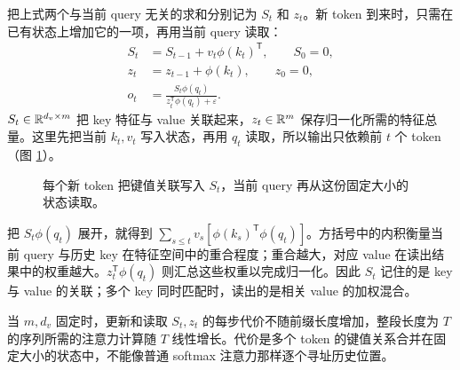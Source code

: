 把上式两个与当前 query 无关的求和分别记为 \(S_t\) 和 \(z_t\)。新 token 到来时，只需在已有状态上增加它的一项，再用当前 query 读取：
\begin{align}
S_t&=S_{t-1}+v_t\phi(k_t)^{\mathsf T},\qquad S_0=0,\label{eq:linear-attention-state}\\
z_t&=z_{t-1}+\phi(k_t),\qquad z_0=0,\label{eq:linear-attention-normalizer}\\
o_t&=\frac{S_t\phi(q_t)}{z_t^{\mathsf T}\phi(q_t)+\varepsilon}.\label{eq:linear-attention-output}
\end{align}
\(S_t\in\mathbb{R}^{d_v\times m}\) 把 key 特征与 value 关联起来，\(z_t\in\mathbb{R}^m\) 保存归一化所需的特征总量。这里先把当前 \(k_t,v_t\) 写入状态，再用 \(q_t\) 读取，所以输出只依赖前 \(t\) 个 token（图 \ref{fig:linear-attention-state}）。

\begin{figure}[H]
\centering
{}
\caption{每个新 token 把键值关联写入 \(S_t\)，当前 query 再从这份固定大小的状态读取。}
\label{fig:linear-attention-state}
\end{figure}

把 \(S_t\phi(q_t)\) 展开，就得到 \(\sum_{s\le t}v_s[\phi(k_s)^{\mathsf T}\phi(q_t)]\)。方括号中的内积衡量当前 query 与历史 key 在特征空间中的重合程度；重合越大，对应 value 在读出结果中的权重越大。\(z_t^{\mathsf T}\phi(q_t)\) 则汇总这些权重以完成归一化。因此 \(S_t\) 记住的是 key 与 value 的关联；多个 key 同时匹配时，读出的是相关 value 的加权混合。

当 \(m,d_v\) 固定时，更新和读取 \(S_t,z_t\) 的每步代价不随前缀长度增加，整段长度为 \(T\) 的序列所需的注意力计算随 \(T\) 线性增长。代价是多个 token 的键值关系合并在固定大小的状态中，不能像普通 softmax 注意力那样逐个寻址历史位置。

